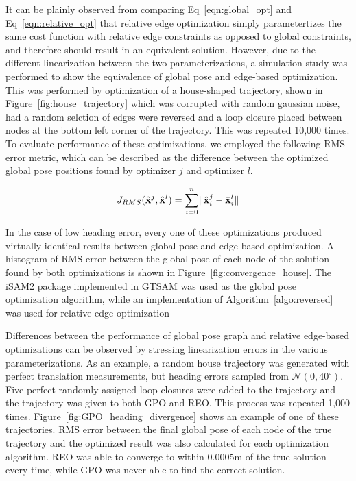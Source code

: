 It can be plainly observed from comparing Eq~\ref{eqn:global_opt} and Eq~\ref{eqn:relative_opt} that relative edge optimization simply parametertizes the same cost function with relative edge constraints as opposed to global constraints, and therefore should result in an equivalent solution.  However, due to the different linearization between the two parameterizations, a simulation study was performed to show the equivalence of global pose and edge-based optimization. This was performed by optimization of a house-shaped trajectory, shown in Figure~\ref{fig:house_trajectory} which was corrupted with random gaussian noise, had a random selction of edges were reversed and a loop closure placed between nodes at the bottom left corner of the trajectory. This was repeated 10,000 times.  To evaluate performance of these optimizations, we employed the following RMS error metric, which can be described as the difference between the optimized global pose positions found by optimizer $j$ and optimizer $l$.

\begin{align}
    J_{RMS}(\hat{\mathbf{x}}^j, \hat{\mathbf{x}}^l) = \sum_{i=0}^n \lVert \hat{\mathbf{x}}^j_i - \hat{\mathbf{x}}^l_i \rVert
\end{align}

In the case of low heading error, every one of these optimizations produced virtually identical results between global pose and edge-based optimization.  A histogram of RMS error between the global pose of each node of the solution found by both optimizations is shown in Figure~\ref{fig:convergence_house}.  The iSAM2 package implemented in GTSAM was used as the global pose optimization algorithm, while an implementation of Algorithm~\ref{algo:reversed} was used for relative edge optimization

Differences between the performance of global pose graph and relative edge-based optimizations can be observed by stressing linearization errors in the various parameterizations.  As an example, a random house trajectory was generated with perfect translation measurements, but heading errors sampled from $\mathcal{N}(0, 40^\circ)$. Five perfect randomly assigned loop closures were added to the trajectory and the trajectory was given to both GPO and REO.  This process was repeated 1,000 times.  Figure~\ref{fig:GPO_heading_divergence} shows an example of one of these trajectories.  RMS error between the final global pose of each node of the true trajectory and the optimized result was also calculated for each optimization algorithm. REO was able to converge to within 0.0005m of the true solution every time, while GPO was never able to find the correct solution.

